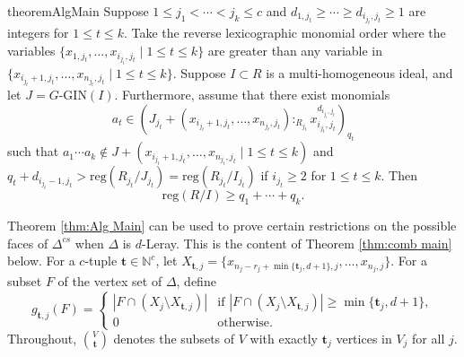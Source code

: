 \documentclass[a4paper, 10pt, reqno, english, ones]{amsart}  %
\theoremstyle{definition}
\theoremstyle{remark}
\begin{document}

\begin{restatable}{theorem}{AlgMain}\label{thm:Alg Main}
     Suppose $1\leq j_1 <\cdots < j_k\leq c$ and $d_{1,j_t}\geq \cdots \geq d_{i_{j_t},j_t}\geq 1 $ are integers for $1\leq t\leq k$. Take the reverse lexicographic monomial order where the variables $\{x_{1,{j_t}},\dots,x_{i_{j_t},{j_t}} \mid 1\leq t \leq k\}$ are greater than any variable in $\{x_{i_{j_t}+1,{j_t}},\dots,x_{n_{j_t},{j_t}} \mid 1\leq t \leq k\}$. Suppose $I\subset R$ is a multi-homogeneous ideal, and let $J=G\textrm{-GIN}(I)$.  Furthermore, assume that there exist monomials 
    \[
    a_t\in \left(J_{j_t} + (x_{i_{j_t}+1,j_t},\dots,x_{n_{j_t},j_t}):_{R_{j_t}} x_{i_{j_t},j_t}^{d_{i_{j_t},j_t}}\right)_{q_t}
    \]
    such that $a_1\cdots a_k\notin J+\left(x_{i_{j_t}+1,j_t},\dots,x_{n_{j_t},j_t} \mid 1\leq t\leq k\right)$ and $q_{t}+d_{i_{j_t}-1,j_t} > \textrm{reg}(R_{j_t}/J_{j_t})=\textrm{reg}(R_{j_t}/I_{j_t})$ if $i_{j_t}\geq 2$ for  $1\leq t\leq k$.
    Then 
    \[
    \textrm{reg}(R/I)\geq q_1+\cdots+q_k. 
    \] 
\end{restatable}

Theorem \ref{thm:Alg Main} can be used to prove certain restrictions on the possible faces of $\Delta^{cs}$ when $\Delta$ is $d$-Leray. This is the content of Theorem \ref{thm:comb main} below. For a $c$-tuple $\mathbf{t}\in \mathbb{N}^c$, let $X_{\mathbf{t},j}=\{x_{n_j-r_j+\min\{\mathbf{t}_j,d+1\},j},\dots,x_{n_j,j}\}$. For a subset $F$ of the vertex set of $\Delta$, define 
\[
g_{\mathbf{t},j}(F)=\begin{cases}
|F\cap (X_j\setminus{X_{\mathbf{t},j}})| & \textrm{if } |F\cap (X_j\setminus{X_{\mathbf{t},j}})|\geq \min\{\mathbf{t}_j,d+1\},\\
 0 &\textrm {otherwise.}
\end{cases}
\]
Throughout, ${V \choose \mathbf{t}}$ denotes the subsets of $V$ with exactly $\mathbf{t}_j$ vertices in $V_j$ for all $j$.
\end{document}
